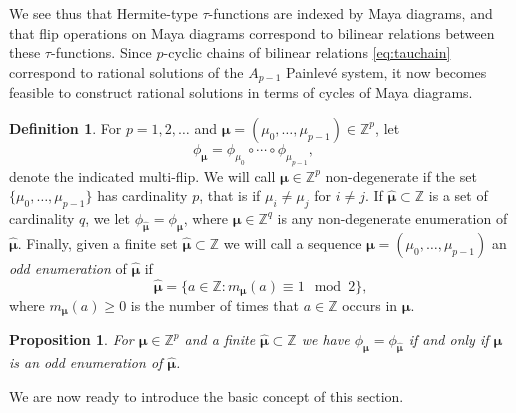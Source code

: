 \documentclass{amsart}
\newtheorem{proposition}{Proposition}
\theoremstyle{definition}
\newtheorem{definition}{Definition}
\DeclareMathOperator{\supp}{\operatorname{Supp}}
\newcommand{\Z}{\mathbb{Z}}
\newcommand{\bmu}{{\boldsymbol{\mu}}}
\newcommand{\hbmu}{{\hat{\bmu}}}
\begin{document}
We see thus that Hermite-type $\tau$-functions are indexed by Maya
diagrams, and that flip operations on Maya diagrams correspond to
bilinear relations between these $\tau$-functions.  Since $p$-cyclic
chains of bilinear relations \eqref{eq:tauchain} correspond to
rational solutions of the $A_{p-1}$ Painlev\'e system, it now becomes
feasible to construct rational solutions in terms of cycles of Maya
diagrams.

\begin{definition}
  \label{def:multiflip}
  For $p=1,2,\ldots$ and $\bmu=(\mu_0,\ldots, \mu_{p-1})\in \Z^p$, let
   \begin{equation}
     \label{eq:phimudef}
     \phi_\bmu= \phi_{\mu_0} \circ \cdots \circ
     \phi_{\mu_{p-1}},\quad
   \end{equation}
   denote the indicated multi-flip.
   We will call $\bmu\in \Z^p$ non-degenerate if the set
   $\{ \mu_0,\ldots, \mu_{p-1} \}$ has cardinality $p$, that is if
   $\mu_i\neq \mu_j$ for $i\neq j$.  If $\hbmu\subset \Z$ is a set of
   cardinality $q$, we let $\phi_\hbmu = \phi_\bmu$, where
   $\bmu\in \Z^q$ is any non-degenerate enumeration of $\hbmu$.
   Finally, given a finite set $\hbmu\subset \Z$ we will call a
   sequence $\bmu=(\mu_0,\ldots, \mu_{p-1})$ an \emph{odd enumeration}
   of $\hbmu$ if
   \[ \hbmu = \{ a\in \Z \colon m_\bmu(a) \equiv 1 \mod 2 \},\] where
   $m_\bmu(a)\geq 0$ is the number of times that $a\in \Z$ occurs
   in $\bmu$.
\end{definition}

\begin{proposition}
  \label{prop:oddenum}
  For $\bmu\in \Z^p$ and a finite $\hbmu\subset \Z$ we have
  $\phi_\bmu = \phi_\hbmu$ if and only if $\bmu$ is an odd enumeration
  of $\hbmu$.
\end{proposition}
We are now ready to introduce the basic concept of this section.
\end{document}
